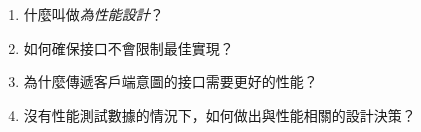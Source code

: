 \begin{enumerate}
\item 
什麼叫做\textit{為性能設計}？

\item 
如何確保接口不會限制最佳實現？

\item 
為什麼傳遞客戶端意圖的接口需要更好的性能？

\item
沒有性能測試數據的情況下，如何做出與性能相關的設計決策？

\end{enumerate}